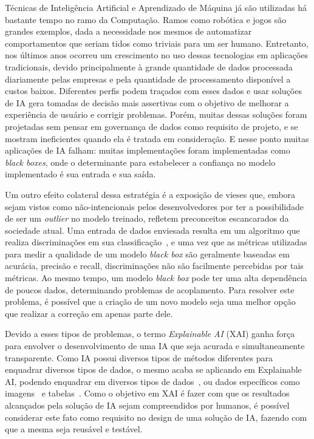 \documentclass{article}
\begin{document}
Técnicas de Inteligência Artificial e Aprendizado de Máquina já são utilizadas há bastante tempo no ramo da Computação. Ramos como robótica e jogos são grandes exemplos, dada a necessidade nos mesmos de automatizar comportamentos que seriam tidos como triviais para um ser humano. Entretanto, nos últimos anos ocorreu um crescimento no uso dessas tecnologias em aplicações tradicionais, devido principalmente à grande quantidade de dados processada diariamente pelas empresas e pela quantidade de processamento disponível a custos baixos. Diferentes perfis podem traçados com esses dados e usar soluções de IA gera tomadas de decisão mais assertivas com o objetivo de melhorar a experiência de usuário e corrigir problemas. Porém, muitas dessas soluções foram projetadas sem pensar em governança de dados como requisito de projeto, e se mostram ineficientes quando ela é tratada em consideração. E nesse ponto muitas aplicações de IA falham: muitas implementações foram implementadas como \textit{black boxes}, onde o determinante para estabelecer a confiança no modelo implementado é sua entrada e sua saída.

Um outro efeito colateral dessa estratégia é a exposição de vieses que, embora sejam vistos como não-intencionais pelos desenvolvedores por ter a possibilidade de ser um \textit{outlier} no modelo treinado, refletem preconceitos escancarados da sociedade atual. Uma entrada de dados enviesada resulta em um algoritmo que realiza discriminações em sua classificação~\citep{Buolamwini_2018}, e uma vez que as métricas utilizadas para medir a qualidade de um modelo \textit{black box} são geralmente baseadas em acurácia, precisão e recall, discriminações não são facilmente percebidas por tais métricas. Ao mesmo tempo, um modelo \textit{black box} pode ter uma alta dependência de poucos dados, determinando problemas de acoplamento. Para resolver este problema, é possível que a criação de um novo modelo seja uma melhor opção que realizar a correção em apenas parte dele.

Devido a esses tipos de problemas, o termo \textit{Explainable AI} (XAI) ganha força para envolver o desenvolvimento de uma IA que seja acurada e simultaneamente transparente. Como IA possui diversos tipos de métodos diferentes para enquadrar diversos tipos de dados, o mesmo acaba se aplicando em Explainable AI, podendo enquadrar em diversos tipos de dados~\citep{Sundararajan_2017}, ou dados específicos como imagens~\citep{Kapishnikov_2019} e tabelas~\citep{Maleki_2013}. Como o objetivo em XAI é fazer com que os resultados alcançados pela solução de IA sejam compreendidos por humanos, é possível considerar este fato como requisito no design de uma solução de IA, fazendo com que a mesma seja reusável e testável.
\end{document}
